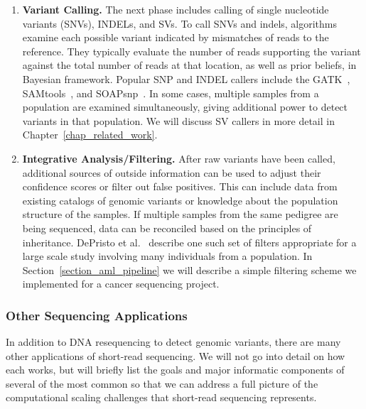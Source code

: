 \begin{enumerate}
\item \textbf{Variant Calling.} The next phase includes calling of single nucleotide variants (SNVs), INDELs, and SVs. To call SNVs and indels, algorithms examine each possible variant indicated by mismatches of reads to the reference. They typically evaluate the number of reads supporting the variant against the total number of reads at that location, as well as prior beliefs, in Bayesian framework. Popular SNP and INDEL callers include the GATK~\cite{McKenna:2010p1051}, SAMtools~\cite{Li:2009vz}, and SOAPsnp~\cite{Li:2009p1236}. In some cases, multiple samples from a population are examined simultaneously, giving additional power to detect variants in that population. We will discuss SV callers in more detail in Chapter~\ref{chap_related_work}.

\item \textbf{Integrative Analysis/Filtering.} After raw variants have been called, additional sources of outside information can be used to adjust their confidence scores or filter out false positives. This can include data from existing catalogs of genomic variants or knowledge about the population structure of the samples. If multiple samples from the same pedigree are being sequenced, data can be reconciled based on the principles of inheritance. DePristo et al.~\cite{DePristo:2011fo} describe one such set of filters appropriate for a large scale study involving many individuals from a population. In Section~\ref{section_aml_pipeline} we will describe a simple filtering scheme we implemented for a cancer sequencing project.

\end{enumerate}

\subsubsection{Other Sequencing Applications}

In addition to DNA resequencing to detect genomic variants, there are many other applications of short-read sequencing. We will not go into detail on how each works, but will briefly list the goals and major informatic components of several of the most common so that we can address a full picture of the computational scaling challenges that short-read sequencing represents. 

